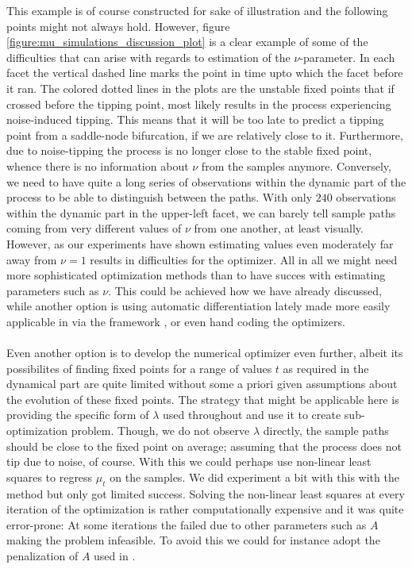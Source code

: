 This example is of course constructed for sake of illustration and the following points might not always hold. However, figure \ref{figure:mu_simulations_discussion_plot} is a clear example of some of the difficulties that can arise with regards to estimation of the $\nu$-parameter. In each facet the vertical dashed line marks the point in time upto which the facet before it ran. The colored dotted lines in the plots are the unstable fixed points that if crossed before the tipping point, most likely results in the process experiencing noise-induced tipping. This means that it will be too late to predict a tipping point from a saddle-node bifurcation, if we are relatively close to it. Furthermore, due to noise-tipping the process is no longer close to the stable fixed point, whence there is no information about $\nu$ from the samples anymore. Conversely, we need to have quite a long series of observations within the dynamic part of the process to be able to distinguish between the paths. With only $240$ observations within the dynamic part in the upper-left facet, we can barely tell sample paths coming from very different values of $\nu$ from one another, at least visually. However, as our experiments have shown estimating values even moderately far away from $\nu = 1$ results in difficulties for the optimizer. All in all we might need more sophisticated optimization methods than  to have succes with estimating parameters such as $\nu$. This could be achieved how we have already discussed, while another option is using automatic differentiation lately made more easily applicable in  via the  framework \cite{torch}, or even hand coding the optimizers. \\\\
Even another option is to develop the numerical optimizer even further, albeit its possibilites of finding fixed points for a range of values $t$ as required in the dynamical part are quite limited without some a priori given assumptions about the evolution of these fixed points. The strategy that might be applicable here is providing the specific form of $\lambda$ used throughout and use it to create sub-optimization problem. Though, we do not observe $\lambda$ directly, the sample paths should be close to the fixed point on average; assuming that the process does not tip due to noise, of course. With this we could perhaps use non-linear least squares to regress $\mu_t$ on the samples. We did experiment a bit with this with the method  but only got limited success. Solving the non-linear least squares at every iteration of the optimization is rather computationally expensive and it was quite error-prone: At some iterations the  failed due to other parameters such as $A$ making the problem infeasible. To avoid this we could for instance adopt the penalization of $A$ used in \cite{Ditlevsen2023}.\\
